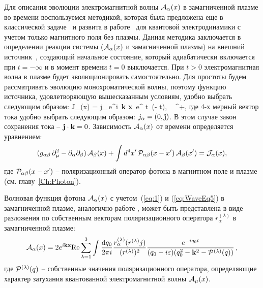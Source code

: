 Для описания эволюции электромагнитной волны ${\cal A}_{\alpha}(x)$  в замагниченной плазме
во времени воспользуемся методикой, которая была предложена еще в классической 
задаче~\cite{Landau:1946} и развита  в работе~\cite{MikhChist:2001} для 
квантовой электродинамики с учетом только магнитного поля без плазмы. Данная 
методика заключается в определении реакции системы 
(${\cal A}_{\alpha}(x)$ и замагниченной плазмы) на внешний источник~\cite{Kirzhnits:1987}, создающий начальное состояние, который адиабатически включается 
при $t = - \infty$ и в момент времени $t = 0$ выключается. При $t > 0$
электромагнитная волна в плазме будет эволюционировать самостоятельно. Для простоты будем рассматривать эволюцию монохроматической волны, поэтому 
функцию источника, удовлетворяющую вышесказанным условиям, удобно выбрать следующим образом:
%
\beq
{\cal J}_{\alpha}(x) = j_{\alpha}\,e^{i \,{\bf k} {\bf x}}\,
e^{ \varepsilon t}\, \theta(- t), \,\,\, \varepsilon {}^+,
\label{eq:1}
\eeq
где 4-х мерный вектор тока удобно выбрать следующим образом: $j_{\alpha} = (0, {\bf j})$. В этом случае закон сохранения тока -- ${\bf j} \cdot {\bf k} = 0$. Зависимость ${\cal A}_{\alpha}(x)$ от 
времени  определяется уравнением:
%
\begin{eqnarray}\label{eq:WaveEq5}
(g_{\alpha \beta} \, \partial_{\mu}^2  -
\partial_{\alpha}\partial_{\beta}) \, {\cal A}_{\beta}(x) + 
\int d^4 x'\, {\cal P}_{\alpha \beta} (x - x') \, {\cal A}_{\beta}(x')
= {\cal J}_{\alpha}(x),
\label{eq:2}
\end{eqnarray}
где ${\cal P}_{\alpha \beta} (x - x')$ -- поляризационный оператор фотона в 
магнитном поле и плазме (см. главу~\ref{Ch:Photon}).



Волновая функция фотона ${\cal A}_\alpha(x)$ с учетом~(\ref{eq:1}) и (\ref{eq:WaveEq5}) в замагниченной плазме, аналогично работе \cite{MikhChist:2001}, может быть представлена  в виде разложения по собственным векторам поляризационного оператора $r_\alpha^{(\lambda)}$ в замагниченной плазме:
\begin{equation}\label{eq:ASolvePlasma}
	{\cal A}_\alpha(x) = 2 e^{i \mathbf{kx}} \mathrm{Re} \sum_{\lambda=1}^3 \int\frac{\mathrm{d} q_0}{2\pi i}\frac{r_\alpha^{(\lambda)}(r^{(\lambda)} j)}{(r^{(\lambda)})^2}\frac{e^{-i q_0 t}}{(q_0-i\varepsilon)(q_0^2-\mathbf{k}^2-{\cal P}^{(\lambda)}(q))}\, ,
\end{equation}
где ${\cal P}^{(\lambda)}(q)$ -- собственные значения поляризационного оператора, определяющие характер затухания квантованной электромагнитной волны ${\cal A}_\mu(x)$.

